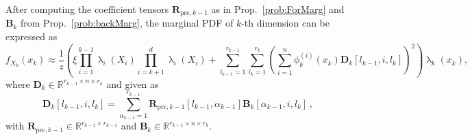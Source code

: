 After computing the coefficient tensors $\bm{R}_{\text{pre},k-1}$ as in Prop.~\ref{prob:ForMarg} and $\bm{B}_{k}$ from Prop.~\ref{prob:backMarg}, the marginal PDF of $k$-th dimension can be expressed as
\begin{equation}
	f_{X_k}(x_k)  \approx \frac{1}{z} \left(\xi \prod_{i=1}^{k-1} \uplambda_i(X_i) \prod_{i=k+1}^{d} \uplambda_i(X_i) + \sum_{l_{k-1}=1}^{r_{k-1}} \sum_{l_k=1}^{r_k} \left(\sum_{i=1}^{n} \phi^{(i)}_k(x_k) \bm{D}_k[l_{k-1},i, l_k] \right)^2 \right) \uplambda_k(x_k), \label{eq:MargTT}
\end{equation}
where $\bm{D}_k \in \mathbb{R}^{r_{k-1} \times n \times r_k}$ and given as
\begin{equation}
	\bm{D}_k[l_{k-1},i,l_k] = \sum_{\alpha_{k-1}=1}^{r_{k-1}}  \bm{R}_{\text{pre},k-1}[l_{k-1}, \alpha_{k-1}] \bm{B}_k[\alpha_{k-1}, i, l_k] \, ,
\end{equation}
with $\bm{R}_{\text{pre},k-1}\in \mathbb{R}^{r_{k-1} \times r_{k-1}}$ and $\bm{B}_k \in \mathbb{R}^{r_{k-1} \times n \times r_k}$.

